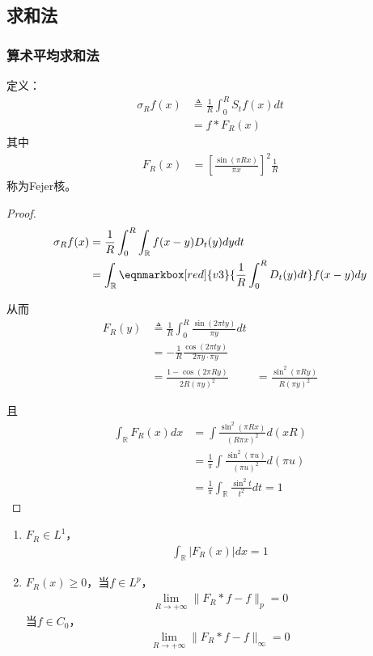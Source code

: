 \subsection{求和法}
\subsubsection{算术平均求和法}
定义：
\begin{align*}
    \sigma_R f(x) &\triangleq \frac{1}{R} \int_0^R S_t f(x) dt \\
    & = f * F_R(x)
\end{align*}
其中
\begin{align*}
    F_R(x) & = \left[\frac{\sin (\pi R x)}{\pi x }\right]^2 \frac{1}{R}
\end{align*}
称为Fejer核。
\begin{proof}
    \begin{align*}
        \sigma_R f(x) &= \frac{1}{R} \int_0^R \int_{\mathbb{R}} f(x-y) D_t(y) dy dt \\
        & = \int_{\mathbb{R}} \eqnmarkbox[red]{v3}{\frac{1}{R} \int_0^R D_t(y) dt} f(x-y) dy
    \end{align*}

    从而
    \begin{align*}
        F_R(y) &\triangleq \frac{1}{R} \int_0^R \frac{\sin(2\pi t y)}{\pi y} dt \\
        & = -\frac{1}{R} \frac{\cos(2\pi t y)}{2\pi y \cdot \pi y} \\
& = \frac{1- \cos(2\pi R y)}{2R(\pi y)^2}
& = \frac{\sin^2(\pi R y)}{R(\pi y)^2}
    \end{align*}

   且
   \begin{align*}
       \int_{\mathbb{R}} F_R(x) dx & = \int \frac{\sin^2(\pi R x)}{(R\pi x)^2} d(xR) \\
       & = \frac{1}{\pi} \int \frac{\sin^2(\pi u)}{(\pi u)^2} d(\pi u) \\
       & = \frac{1}{\pi} \int_{\mathbb{R}} \frac{\sin^2 t }{t^2} dt = 1
   \end{align*}
\end{proof}

\begin{enumerate}[leftmargin=1cm, label=\arabic*]
    \item $F_R\in L^1$，
    \begin{align*}
        \int_{\mathbb{R}} |F_R(x)| dx = 1
    \end{align*}

    \item $F_R(x) \geqslant 0$，当$f\in L^p$，
    \begin{align*}
        \lim\limits_{R\to+\infty} \| F_R * f - f\|_p = 0
    \end{align*}
    当$f\in C_0$，
    \begin{align*}
        \lim\limits_{R\to +\infty} \|F_R*f - f\|_{\infty} = 0
    \end{align*}
\end{enumerate}

